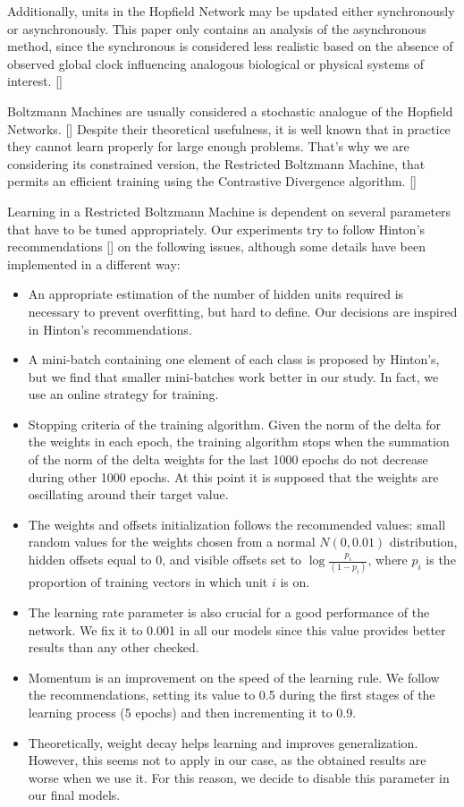 \documentclass[anon]{CI}
\begin{document}
Additionally, units in the Hopfield Network may be updated either synchronously or asynchronously. This paper only contains an analysis of the asynchronous method, since the synchronous is considered less realistic based on the absence of observed global clock influencing analogous biological or physical systems of interest. [\cite{MacKay2003}]

Boltzmann Machines are usually considered a stochastic analogue of the Hopfield Networks. [\cite{Ackley1985147}] Despite their theoretical usefulness, it is well known that in practice they cannot learn properly for large enough problems. That’s why we are considering its constrained version, the Restricted Boltzmann Machine, that permits an efficient training using the Contrastive Divergence algorithm. [\cite{carreira2005contrastive}]

Learning in a Restricted Boltzmann Machine is dependent on several parameters that have to be tuned appropriately. Our experiments try to follow Hinton’s recommendations [\cite{Hinton2012}] on the following issues, although some details have been implemented in a different way:
\begin{itemize}
	\item An appropriate estimation of the number of hidden units required is necessary to prevent overfitting, but hard to define. Our decisions are inspired in Hinton’s recommendations.
	\item A mini-batch containing one element of each class is proposed by Hinton’s, but we find that smaller mini-batches work better in our study.  In fact, we use an online strategy for training.
	\item  Stopping criteria of the training algorithm. Given the norm of the delta for the weights in each epoch, the training algorithm stops when the summation of the norm of the delta weights for the last 1000 epochs do not decrease during other 1000 epochs. At this point it is supposed that the weights are oscillating around their target value.
	\item The weights and offsets initialization follows the recommended values: small random values for the weights chosen from a normal $N(0,0.01)$ distribution, hidden offsets equal to 0, and visible offsets set to $\log{\frac{p_i}{(1-p_i)}}$, where $p_i$ is the proportion of training vectors in which unit $i$ is on.
	\item The learning rate parameter is also crucial for a good performance of the network. We fix it to 0.001 in all our models since this value provides better results than any other checked.
	\item Momentum is an improvement on the speed of the learning rule. We follow the recommendations, setting its value to 0.5 during the first stages of the learning process (5 epochs) and then incrementing it to 0.9.
	\item Theoretically, weight decay helps learning and improves generalization. However, this seems not to apply in our case, as the obtained results are worse when we use it. For this reason, we decide to disable this parameter in our final models.
	
\end{itemize}
\end{document}
